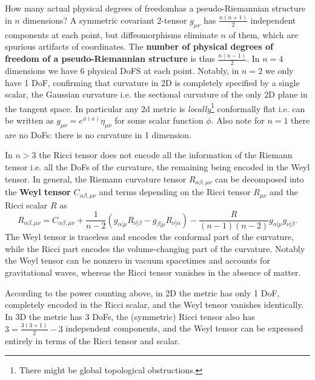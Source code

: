 \documentclass[../geometry_main.tex]{subfiles}
\begin{document}
\begin{mytheorem}
How many  actual physical degrees of freedomhas a pseudo-Riemannian structure in \(n\) dimensions?
A symmetric covariant 2-tensor \(g_{\mu \nu}\) has \(\frac{n(n+1)}{2}\) independent components at each point, but diffeomorphisms eliminate \(n\) of them, which are spurious artifacts of coordinates.
The \textbf{number of physical degrees of freedom of a pseudo-Riemannian structure} is thus \(\frac{n(n-1)}{2}\).
In \(n=4\) dimensions we have 6 physical DoFS at each point.
Notably, in $n=2$ we only have 1 DoF, confirming that curvature in 2D is completely specified by a single scalar, the Gaussian curvature i.e. the sectional curvature of the only 2D plane in the tangent space.
In particular any 2d metric is \emph{locally}\footnote{There might be global topological obstructions.} conformally flat i.e. can be written as \(g_{\mu\nu}=e^{\phi(x)}\eta_{\mu\nu}\) for some scalar function \(\phi\).
Also note for $n=1$ there are no DoFs: there is no curvature in 1 dimension.
%
\end{mytheorem}


\begin{mytheorem}
%
In $n>3$ the Ricci tensor does not encode all the information of the Riemann tensor i.e. all the DoFs of the curvature, the remaining being encoded in the Weyl tensor.
In general, the Riemann curvature tensor \(R_{\alpha \beta, \mu \nu}\) can be decomposed into the \textbf{Weyl tensor} \(C_{\alpha \beta, \mu \nu}\) and terms depending on the Ricci tensor \(R_{\mu \nu}\) and the Ricci scalar \(R\) as
\begin{equation}
    R_{\alpha \beta, \mu \nu} = C_{\alpha \beta, \mu \nu} + \frac{1}{n-2} \left( g_{\alpha [\mu} R_{\nu] \beta} - g_{\beta [\mu} R_{\nu] \alpha} \right) - \frac{R}{(n-1)(n-2)} g_{\alpha [\mu} g_{\nu] \beta}.
\end{equation}
The Weyl tensor is traceless and encodes the conformal part of the curvature, while the Ricci part encodes the volume-changing part of the curvature.
Notably the Weyl tensor can be nonzero in vacuum spacetimes and accounts for gravitational waves, whereas the Ricci tensor vanishes in the absence of matter.

According to the power counting above, in 2D the metric has only 1 DoF, completely encoded in the Ricci scalar, and the Weyl tensor vanishes identically.
In 3D the metric has 3 DoFs, the (symmetric) Ricci tensor also has $3=\frac{3(3+1)}{2}-3$ independent components, and the Weyl tensor can be expressed entirely in terms of the Ricci tensor and scalar.
%
\end{mytheorem}
\end{document}
